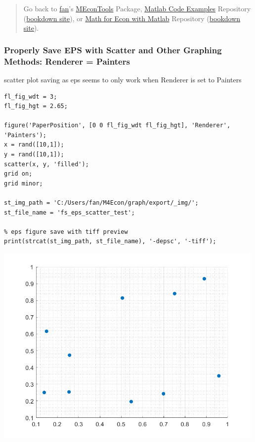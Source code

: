 \documentclass[
]{book}
\begin{document}
\begin{quote}
Go back to \href{http://fanwangecon.github.io/}{fan}'s \href{https://fanwangecon.github.io/MEconTools/}{MEconTools} Package, \href{https://fanwangecon.github.io/M4Econ/}{Matlab Code Examples} Repository (\href{https://fanwangecon.github.io/M4Econ/bookdown}{bookdown site}), or \href{https://fanwangecon.github.io/Math4Econ/}{Math for Econ with Matlab} Repository (\href{https://fanwangecon.github.io/Math4Econ/bookdown}{bookdown site}).
\end{quote}

\hypertarget{properly-save-eps-with-scatter-and-other-graphing-methods-renderer-painters}{%
\subsubsection{Properly Save EPS with Scatter and Other Graphing Methods: Renderer = Painters}\label{properly-save-eps-with-scatter-and-other-graphing-methods-renderer-painters}}

scatter plot saving as eps seems to only work when Renderer is set to
Painters

\begin{verbatim}
fl_fig_wdt = 3;
fl_fig_hgt = 2.65;

figure('PaperPosition', [0 0 fl_fig_wdt fl_fig_hgt], 'Renderer', 'Painters');
x = rand([10,1]);
y = rand([10,1]);
scatter(x, y, 'filled');
grid on;
grid minor;

st_img_path = 'C:/Users/fan/M4Econ/graph/export/_img/';
st_file_name = 'fs_eps_scatter_test';

% eps figure save with tiff preview
print(strcat(st_img_path, st_file_name), '-depsc', '-tiff');
\end{verbatim}

\includegraphics[width=5.20833in,height=\textheight]{img/fs_eps_images/figure_0.png}
\end{document}
